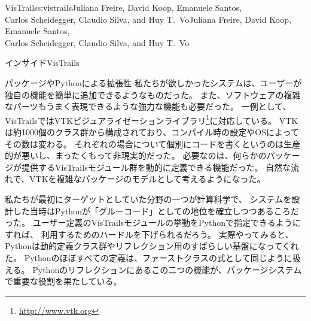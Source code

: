 \begin{aosachaptertoc}{VisTrails}{s:vistrails}{Juliana Freire, David Koop, Emanuele Santos, \\ Carlos Scheidegger, Claudio Silva, and Huy T.\ Vo}{Juliana Freire, David Koop, Emanuele Santos, \\ \hspace*{0.9cm} Carlos Scheidegger, Claudio Silva, and Huy T.\ Vo}
\begin{aosasect1}{インサイドVisTrails}
\begin{aosasect2}{パッケージやPythonによる拡張性}
私たちが欲しかったシステムは、ユーザーが独自の機能を簡単に追加できるようなものだった。
また、ソフトウェアの複雑なパーツもうまく表現できるような強力な機能も必要だった。
一例として、VisTrailsではVTKビジュアライゼーションライブラリ\footnote{\url{http://www.vtk.org}}に対応している。
VTKは約1000個のクラス群から構成されており、コンパイル時の設定やOSによってその数は変わる。
それぞれの場合について個別にコードを書くというのは生産的が悪いし、まったくもって非現実的だった。
必要なのは、何らかのパッケージが提供するVisTrailsモジュール群を動的に定義できる機能だった。
自然な流れで、VTKを複雑なパッケージのモデルとして考えるようになった。

私たちが最初にターゲットとしていた分野の一つが計算科学で、
システムを設計した当時はPythonが「グルーコード」としての地位を確立しつつあるころだった。
ユーザー定義のVisTrailsモジュールの挙動をPythonで指定できるようにすれば、
利用するためのハードルを下げられるだろう。
実際やってみると、Pythonは動的定義クラス群やリフレクション用のすばらしい基盤になってくれた。
Pythonのほぼすべての定義は、ファーストクラスの式として同じように扱える。
Pythonのリフレクションにあるこの二つの機能が、パッケージシステムで重要な役割を果たしている。

\begin{aosaitemize}


\end{aosaitemize}
\end{aosasect2}
\end{aosasect1}
\end{aosachaptertoc}
